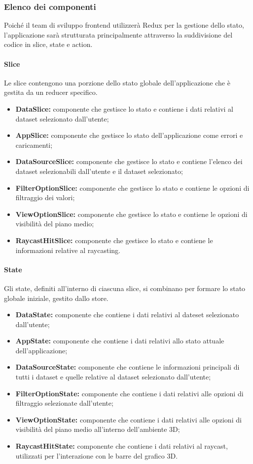 \subsubsection{Elenco dei componenti}
Poiché il team di sviluppo frontend utilizzerà Redux per la gestione dello
stato, l'applicazione sarà strutturata principalmente attraverso la
suddivisione del codice in slice, state e action.
\paragraph{Slice}
Le slice contengono una porzione dello stato globale dell'applicazione che è
gestita da un reducer specifico.
\begin{itemize}
      \item \textbf{DataSlice:} componente che gestisce lo stato e contiene i dati relativi al dataset selezionato dall'utente;
      \item \textbf{AppSlice:} componente che gestisce lo stato dell'applicazione come errori e caricamenti;
      \item \textbf{DataSourceSlice:} componente che gestisce lo stato e contiene l'elenco dei dataset selezionabili dall'utente e il dataset selezionato;
      \item \textbf{FilterOptionSlice:} componente che gestisce lo stato e contiene le opzioni di filtraggio dei valori;
      \item \textbf{ViewOptionSlice:} componente che gestisce lo stato e contiene le opzioni di visibilità del piano medio;
      \item \textbf{RaycastHitSlice:} componente che gestisce lo stato e contiene le informazioni relative al raycasting.
\end{itemize}
\paragraph{State}
Gli state, definiti all'interno di ciascuna slice, si combinano per formare lo
stato globale iniziale, gestito dallo store.
\begin{itemize}
      \item \textbf{DataState:} componente che contiene i dati relativi al dateset selezionato dall'utente;
      \item \textbf{AppState:} componente che contiene i dati relativi allo stato attuale dell'applicazione;
      \item \textbf{DataSourceState:} componente che contiene le informazioni principali di tutti i dataset e quelle relative al dataset selezionato dall'utente;
      \item \textbf{FilterOptionState:} componente che contiene i dati relativi alle opzioni di filtraggio selezionate dall'utente;
      \item \textbf{ViewOptionState:} componente che contiene i dati relativi alle opzioni di visibilità del piano medio all'interno dell'ambiente 3D;
      \item \textbf{RaycastHitState:} componente che contiene i dati relativi al raycast, utilizzati per l'interazione con le barre del grafico 3D.
\end{itemize}
